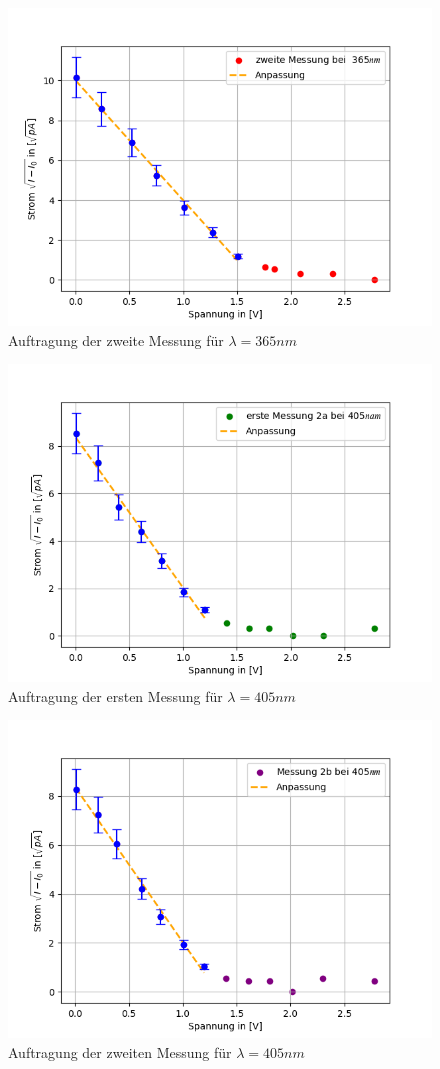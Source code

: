 \documentclass{article}
\begin{document}
\begin{figure}[h!]
  \centering
  \includegraphics[width=.8\linewidth]{402_365nm_b.png}
  \caption{Auftragung der zweite Messung für $\lambda =365nm$}
  \label{fig:wellenlaenge_365nm_b}
\end{figure}

\begin{figure}[h!]
  \centering
  \includegraphics[width=.8\linewidth]{402_405nm_a.png}
  \caption{Auftragung der ersten Messung für $ \lambda =405nm$}
  \label{fig:wellenlaenge_405nm_a}
\end{figure}

\begin{figure}[h!]
  \centering
  \includegraphics[width=.8\linewidth]{402_405nm_b.png}
  \caption{Auftragung der zweiten Messung für $\lambda =405nm$}
  \label{fig:wellenlaenge_405nm_b}
\end{figure}
\end{document}
